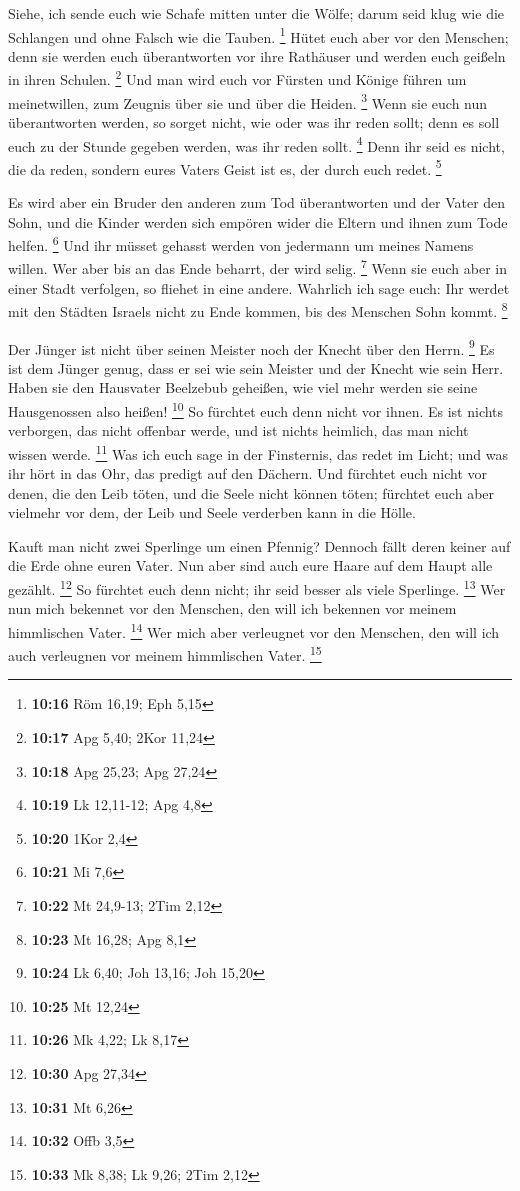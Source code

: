  Siehe, ich sende euch wie Schafe mitten unter die Wölfe;
darum seid klug wie die Schlangen und ohne Falsch wie die Tauben.
\footnote{\textbf{10:16} Röm 16,19; Eph 5,15}  Hütet euch
aber vor den Menschen; denn sie werden euch überantworten vor ihre
Rathäuser und werden euch geißeln in ihren Schulen. \footnote{\textbf{10:17}
  Apg 5,40; 2Kor 11,24}  Und man wird euch vor Fürsten und
Könige führen um meinetwillen, zum Zeugnis über sie und über die Heiden.
\footnote{\textbf{10:18} Apg 25,23; Apg 27,24}  Wenn sie
euch nun überantworten werden, so sorget nicht, wie oder was ihr reden
sollt; denn es soll euch zu der Stunde gegeben werden, was ihr reden
sollt. \footnote{\textbf{10:19} Lk 12,11-12; Apg 4,8}  Denn
ihr seid es nicht, die da reden, sondern eures Vaters Geist ist es, der
durch euch redet. \footnote{\textbf{10:20} 1Kor 2,4}

 Es wird aber ein Bruder den anderen zum Tod überantworten
und der Vater den Sohn, und die Kinder werden sich empören wider die
Eltern und ihnen zum Tode helfen. \footnote{\textbf{10:21} Mi 7,6}
 Und ihr müsset gehasst werden von jedermann um meines
Namens willen. Wer aber bis an das Ende beharrt, der wird selig.
\footnote{\textbf{10:22} Mt 24,9-13; 2Tim 2,12}  Wenn sie
euch aber in einer Stadt verfolgen, so fliehet in eine andere. Wahrlich
ich sage euch: Ihr werdet mit den Städten Israels nicht zu Ende kommen,
bis des Menschen Sohn kommt. \footnote{\textbf{10:23} Mt 16,28; Apg 8,1}

 Der Jünger ist nicht über seinen Meister noch der Knecht
über den Herrn. \footnote{\textbf{10:24} Lk 6,40; Joh 13,16; Joh 15,20}
 Es ist dem Jünger genug, dass er sei wie sein Meister und
der Knecht wie sein Herr. Haben sie den Hausvater Beelzebub geheißen,
wie viel mehr werden sie seine Hausgenossen also heißen! \footnote{\textbf{10:25}
  Mt 12,24}  So fürchtet euch denn nicht vor ihnen. Es ist
nichts verborgen, das nicht offenbar werde, und ist nichts heimlich, das
man nicht wissen werde. \footnote{\textbf{10:26} Mk 4,22; Lk 8,17}
 Was ich euch sage in der Finsternis, das redet im Licht;
und was ihr hört in das Ohr, das predigt auf den Dächern. 
Und fürchtet euch nicht vor denen, die den Leib töten, und die Seele
nicht können töten; fürchtet euch aber vielmehr vor dem, der Leib und
Seele verderben kann in die Hölle.

 Kauft man nicht zwei Sperlinge um einen Pfennig? Dennoch
fällt deren keiner auf die Erde ohne euren Vater.  Nun aber
sind auch eure Haare auf dem Haupt alle gezählt. \footnote{\textbf{10:30}
  Apg 27,34}  So fürchtet euch denn nicht; ihr seid besser
als viele Sperlinge. \footnote{\textbf{10:31} Mt 6,26}  Wer
nun mich bekennet vor den Menschen, den will ich bekennen vor meinem
himmlischen Vater. \footnote{\textbf{10:32} Offb 3,5}  Wer
mich aber verleugnet vor den Menschen, den will ich auch verleugnen vor
meinem himmlischen Vater. \footnote{\textbf{10:33} Mk 8,38; Lk 9,26;
  2Tim 2,12}


